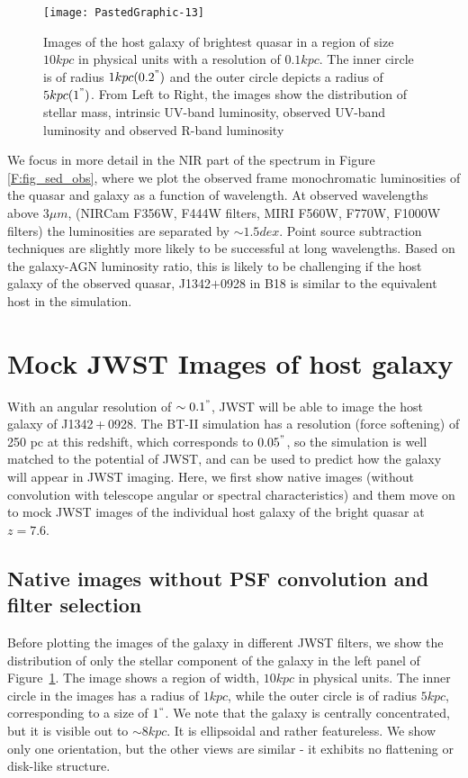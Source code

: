 \documentclass[twocolumn,useAMS,usenatbib]{mnras} \usepackage{natbib}
\begin{document}
\begin{figure*}
\texttt{[image: PastedGraphic-13]}
\caption{\label{F:fig_mock_stellarmass} Images of the host galaxy of brightest quasar in a region of size $10 kpc$ in physical units with a resolution of $0.1 kpc$. The inner circle is of radius $1 kpc (0.2^{"})$ and the outer circle depicts a radius of $5 kpc (1^{"})$. From Left to Right, the images show the distribution of stellar mass, intrinsic UV-band luminosity, observed UV-band luminosity and observed R-band luminosity}
\end{figure*}

We focus in more detail in the NIR part of the spectrum in Figure \ref{F:fig_sed_obs}, where we plot the observed frame monochromatic luminosities of the quasar and galaxy as a function of wavelength. 
At observed wavelengths above $3 \mu m$, (NIRCam F356W, F444W filters, MIRI F560W, F770W, F1000W filters) the luminosities are separated by $\sim 1.5 dex$. Point source subtraction techniques are slightly
more likely to be successful at long wavelengths. Based on the 
galaxy-AGN luminosity ratio, this is likely to be challenging if
the host galaxy of the observed quasar, J1342$+$0928 in B18 is similar to the equivalent host
in the simulation.

\section{Mock JWST Images of host galaxy}\label{galimages}

With an angular resolution of $\sim 0.1^{"}$, JWST will be able to 
image the host galaxy of J1342 + 0928. The BT-II simulation has a
resolution (force softening) of 250 pc at this redshift, which 
corresponds to $0.05^{"}$, so the simulation is well matched
to the potential of JWST, and can be used to predict how the galaxy
will appear in JWST imaging.
Here, we first show native images (without convolution with telescope angular or spectral characteristics) and them move on to mock JWST images of the individual host galaxy of the bright quasar at $z=7.6$. 

\subsection{Native images without PSF convolution and filter selection}\label{galimages_native}

Before plotting the images of the galaxy in different JWST filters, we show the distribution of only the stellar component of the galaxy in the left panel of Figure~\ref{F:fig_mock_stellarmass}. 
The image shows a region of width, $10 kpc$ in physical units. The inner circle in the images has a radius of $1 kpc$, while the outer circle is of radius $5 kpc$, corresponding to a size of $1^{``}$.
We note that the galaxy is centrally concentrated, but it is visible out to $\sim 8 kpc$. It is ellipsoidal and rather featureless. We show only one orientation, but the other views are similar - it exhibits no flattening or disk-like structure.
\end{document}
